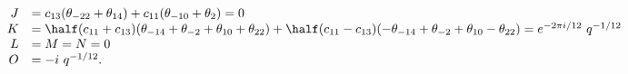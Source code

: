\begin{equation*}
  \begin{array}{rl}
J &= c_{13} (\theta_{-22} +\theta_{14}) +c_{11} (\theta_{-10}
 +\theta_{2}) =0 \\
K &= \half (c_{11}+c_{13})(\theta_{-14} +\theta_{-2}
 +\theta_{10}+ \theta_{22}) + \half
 (c_{11}-c_{13})(-\theta_{-14} +\theta_{-2} +\theta_{10}
 -\theta_{22}) = e^{-2\pi i/12} ~q^{-1/12} \\
L &= M = N = 0 \\
O &= -i ~q^{-1/12}.
  \end{array}
\end{equation*}

